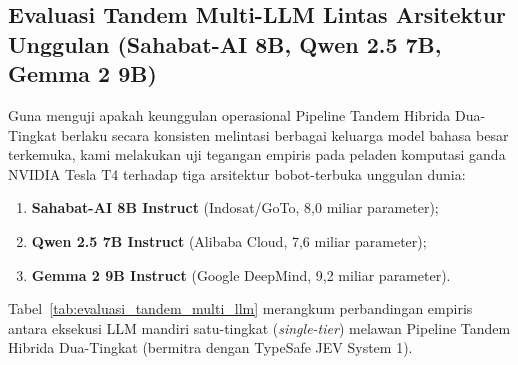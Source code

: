 \documentclass[journal,compsoc]{IEEEtran}
\begin{document}
\subsection{Evaluasi Tandem Multi-LLM Lintas Arsitektur Unggulan (Sahabat-AI 8B, Qwen 2.5 7B, Gemma 2 9B)}
Guna menguji apakah keunggulan operasional Pipeline Tandem Hibrida Dua-Tingkat berlaku secara konsisten melintasi berbagai keluarga model bahasa besar terkemuka, kami melakukan uji tegangan empiris pada peladen komputasi ganda NVIDIA Tesla T4 terhadap tiga arsitektur bobot-terbuka unggulan dunia:
\begin{enumerate}
    \item \textbf{Sahabat-AI 8B Instruct} (Indosat/GoTo, 8,0 miliar parameter);
    \item \textbf{Qwen 2.5 7B Instruct} (Alibaba Cloud, 7,6 miliar parameter);
    \item \textbf{Gemma 2 9B Instruct} (Google DeepMind, 9,2 miliar parameter).
\end{enumerate}
Tabel~\ref{tab:evaluasi_tandem_multi_llm} merangkum perbandingan empiris antara eksekusi LLM mandiri satu-tingkat (\textit{single-tier}) melawan Pipeline Tandem Hibrida Dua-Tingkat (bermitra dengan TypeSafe JEV System 1).
\end{document}
